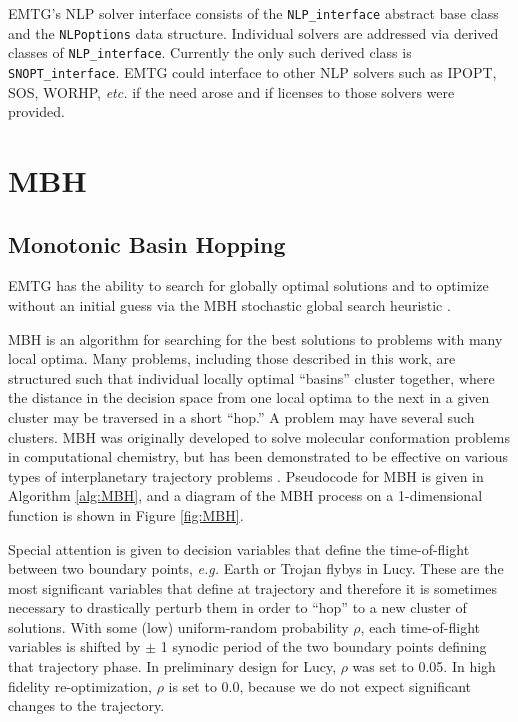 \ac{EMTG}'s \ac{NLP} solver interface consists of the \texttt{NLP\_interface} abstract base class and the \texttt{NLPoptions} data structure. Individual solvers are addressed via derived classes of \texttt{NLP\_interface}. Currently the only such derived class is \texttt{SNOPT\_interface}. \ac{EMTG} could interface to other \ac{NLP} solvers such as IPOPT, SOS, WORHP, \textit{etc.} if the need arose and if licenses to those solvers were provided.

\section{\ac{MBH}}
\label{sec:MBH}

\subsection{Monotonic Basin Hopping}
\label{subsec:MBH}

\ac{EMTG} has the ability to search for globally optimal solutions and to optimize without an initial guess via the \ac{MBH} stochastic global search heuristic \cite{YamDiLorenzoIzzo2011,RaowulfCoverstonePareto,CoverstoneMicroGA,CoverstoneCarroll2000387,VavrinaHowellGAGALLOP,EnglanderConwayWilliamsEMTG,EnglanderConwayWilliamsEMTGLTConferencePaper,EnglanderPhD,EllisonEnglanderConwaySummer2013,EllisonEnglanderOzimekConwayWinter2014,MBH_ISSFD_2014,VavrinaMGAnDSMs}.

\ac{MBH} \cite{ISI:000165808600005} is an algorithm for searching for the best solutions to problems with many local optima. Many problems, including those described in this work, are structured such that individual locally optimal ``basins'' cluster together, where the distance in the decision space from one local optima to the next in a given cluster may be traversed in a short ``hop.'' A problem may have several such clusters. MBH was originally developed to solve molecular conformation problems in computational chemistry, but has been demonstrated to be effective on various types of interplanetary trajectory problems \cite{YamDiLorenzoIzzo2011,ISI:000288709500009,EnglanderConwayWilliamsEMTGLTConferencePaper, EnglanderPhD, EllisonEnglanderConwaySummer2013,ARRM_Option_C}. Pseudocode for \ac{MBH} is given in Algorithm \ref{alg:MBH}, and a diagram of the \ac{MBH} process on a 1-dimensional function is shown in Figure \ref{fig:MBH}.

Special attention is given to decision variables that define the time-of-flight between two boundary points, \textit{e.g.} Earth or Trojan flybys in Lucy. These are the most significant variables that define at trajectory and therefore it is sometimes necessary to drastically perturb them in order to ``hop'' to a new cluster of solutions. With some (low) uniform-random probability $\rho$, each time-of-flight variables is shifted by $\pm$ 1 synodic period of the two boundary points defining that trajectory phase. In preliminary design for Lucy, $\rho$ was set to 0.05. In high fidelity re-optimization, $\rho$ is set to 0.0, because we do not expect significant changes to the trajectory.

